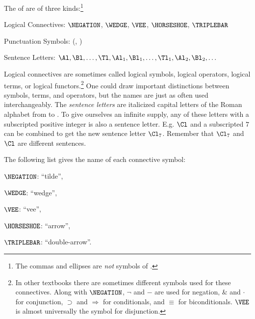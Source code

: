 \begin{majorILnc}{} The  of \GSL{} are of three kinds:\footnote{The commas and ellipses are \emph{not} symbols of \GSL{}.}
\begin{cenumerate}
\item Logical Connectives: $\NEGATION$, $\WEDGE$, $\VEE$, $\HORSESHOE$, $\TRIPLEBAR$
\item Punctuation Symbols: (, )
\item Sentence Letters: $\Al,\Bl, \ldots, \Tl, \Al_1,\Bl_1, \ldots, \Tl_1, \Al_2, \Bl_2, \ldots$  
\end{cenumerate}
\end{majorILnc} 
\noindent{}Logical connectives are sometimes called logical symbols, logical operators, logical terms, or logical functors.\footnote{%
	In other textbooks there are sometimes different symbols used for these connectives. 
	Along with $\NEGATION$, $\neg$ and $-$ are used for negation, $\&$ and $\cdot$ for conjunction, $\supset$ and $\Rightarrow$ for conditionals, and $\equiv$ for biconditionals. $\VEE$ is almost universally the symbol for disjunction.
} 
One could draw important distinctions between symbols, terms, and operators, but the names are just as often used interchangeably.
The \emph{sentence letters} are italicized capital letters of the Roman alphabet from \mention{$\Al$} to \mention{$\Tl$}.
To give ourselves an infinite supply, any of these letters with a subscripted positive integer is also a sentence letter.
E.g. $\Cl$ and a subscripted $7$ can be combined to get the new sentence letter $\Cl_7$.
Remember that $\Cl_7$ and $\Cl$ are different sentences.

The following list gives the name of each connective symbol:

\begin{cenumerate}
	\item $\NEGATION$: ``tilde'',
	\item $\WEDGE$: ``wedge'',
	\item $\VEE$: ``vee'',
	\item $\HORSESHOE$: ``arrow'',
	\item $\TRIPLEBAR$: ``double-arrow''.
\end{cenumerate}

